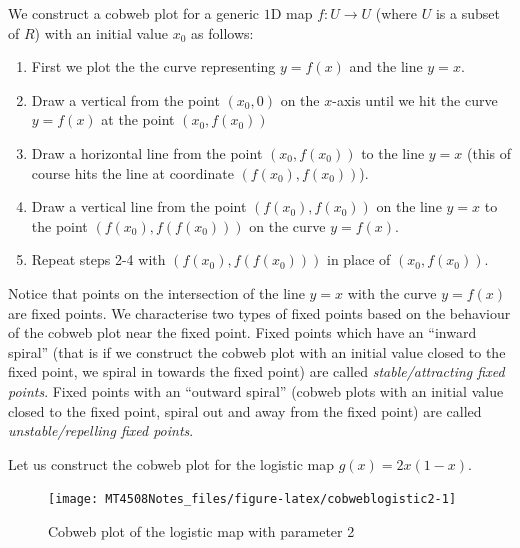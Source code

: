 \documentclass[
  a4paper,
  oneside,
  final]{krantz}
\providecommand{\tightlist}{%
  \setlength{\itemsep}{0pt}\setlength{\parskip}{0pt}}
\theoremstyle{definition}
\theoremstyle{definition}
\theoremstyle{definition}
\theoremstyle{definition}
\theoremstyle{remark}
\begin{document}
We construct a cobweb plot for a generic \(1\)D map \(f:U \to U\) (where \(U\) is a subset of \(R\)) with an initial value \(x_0\) as follows:

\begin{palegreenbox}

\begin{enumerate}
\def\labelenumi{\arabic{enumi}.}
\setcounter{enumi}{-1}
\tightlist
\item
  First we plot the the curve representing \(y = f(x)\) and the line \(y=x\).
\item
  Draw a vertical from the point \((x_0,0)\) on the \(x\)-axis until we hit the curve \(y=f(x)\) at the point \((x_0, f(x_0))\)
\item
  Draw a horizontal line from the point \((x_0, f(x_0))\) to the line \(y=x\) (this of course hits the line at coordinate \((f(x_0), f(x_0))\)).
\item
  Draw a vertical line from the point \((f(x_0), f(x_0))\) on the line \(y=x\) to the point \((f(x_0), f(f(x_0)))\) on the curve \(y= f(x)\).
\item
  Repeat steps 2-4 with \((f(x_0),f(f(x_0)))\) in place of \((x_0, f(x_0))\).
\end{enumerate}

\end{palegreenbox}

Notice that points on the intersection of the line \(y=x\) with the curve \(y=f(x)\) are fixed points. We characterise two types of fixed points based on the behaviour of the cobweb plot near the fixed point. Fixed points which have an ``inward spiral'' (that is if we construct the cobweb plot with an initial value closed to the fixed point, we spiral in towards the fixed point) are called \emph{stable/attracting fixed points}. Fixed points with an ``outward spiral'' (cobweb plots with an initial value closed to the fixed point, spiral out and away from the fixed point) are called \emph{unstable/repelling fixed points}.

Let us construct the cobweb plot for the logistic map \(g(x) = 2x (1-x)\).

\begin{figure}

{\centering \texttt{[image: MT4508Notes\_files/figure-latex/cobweblogistic2-1]} 

}

\caption{Cobweb plot of the logistic map with parameter 2}\label{fig:cobweblogistic2}
\end{figure}
\end{document}

